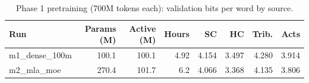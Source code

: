 \begin{table}[t]
\centering\small
\begin{tabular}{lrrrrrrr}
\toprule
Run & Params (M) & Active (M) & Hours & SC & HC & Trib. & Acts \\
\midrule
m1\_dense\_100m & 100.1 & 100.1 & 4.92 & 4.154 & 3.497 & 4.280 & 3.914 \\
m2\_mla\_moe & 270.4 & 101.7 & 6.2 & 4.066 & 3.368 & 4.135 & 3.806 \\
\bottomrule
\end{tabular}
\caption{Phase 1 pretraining (700M tokens each): validation bits per word by source.}
\label{tab:p1-pretrain}
\end{table}
